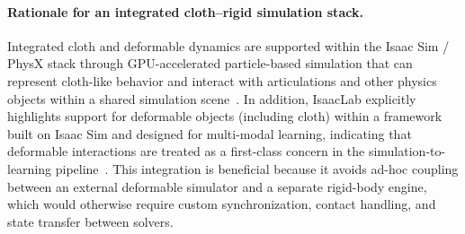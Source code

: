 \paragraph{Rationale for an integrated cloth--rigid simulation stack.}
Integrated cloth and deformable dynamics are supported within the Isaac Sim / PhysX stack through GPU-accelerated particle-based simulation that can represent cloth-like behavior and interact with articulations and other physics objects within a shared simulation scene~\cite{omni_physics_particles}. In addition, IsaacLab explicitly highlights support for deformable objects (including cloth) within a framework built on Isaac Sim and designed for multi-modal learning, indicating that deformable interactions are treated as a first-class concern in the simulation-to-learning pipeline~\cite{Mittal2025IsaacLab}. This integration is beneficial because it avoids ad-hoc coupling between an external deformable simulator and a separate rigid-body engine, which would otherwise require custom synchronization, contact handling, and state transfer between solvers.


